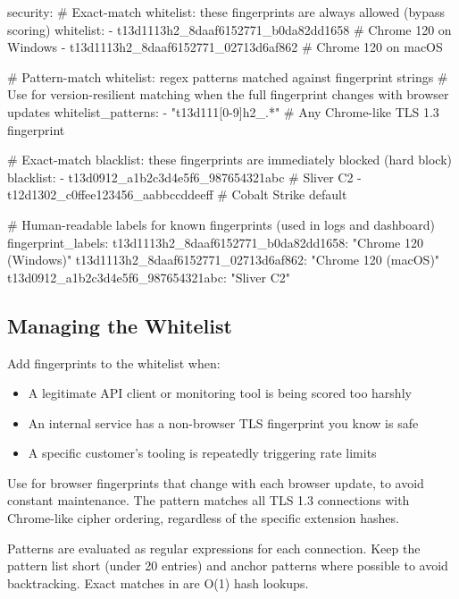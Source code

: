 \begin{yamlcode}
security:
  # Exact-match whitelist: these fingerprints are always allowed (bypass scoring)
  whitelist:
    - t13d1113h2_8daaf6152771_b0da82dd1658  # Chrome 120 on Windows
    - t13d1113h2_8daaf6152771_02713d6af862  # Chrome 120 on macOS

  # Pattern-match whitelist: regex patterns matched against fingerprint strings
  # Use for version-resilient matching when the full fingerprint changes with browser updates
  whitelist_patterns:
    - "t13d111[0-9]h2_.*"  # Any Chrome-like TLS 1.3 fingerprint

  # Exact-match blacklist: these fingerprints are immediately blocked (hard block)
  blacklist:
    - t13d0912_a1b2c3d4e5f6_987654321abc  # Sliver C2
    - t12d1302_c0ffee123456_aabbccddeeff  # Cobalt Strike default

  # Human-readable labels for known fingerprints (used in logs and dashboard)
  fingerprint_labels:
    t13d1113h2_8daaf6152771_b0da82dd1658: "Chrome 120 (Windows)"
    t13d1113h2_8daaf6152771_02713d6af862: "Chrome 120 (macOS)"
    t13d0912_a1b2c3d4e5f6_987654321abc: "Sliver C2"
\end{yamlcode}

\subsection{Managing the Whitelist}

Add fingerprints to the whitelist when:
\begin{itemize}
  \item A legitimate API client or monitoring tool is being scored too harshly
  \item An internal service has a non-browser TLS fingerprint you know is safe
  \item A specific customer's tooling is repeatedly triggering rate limits
\end{itemize}

Use  for browser fingerprints that change with each
browser update, to avoid constant maintenance. The pattern 
matches all TLS 1.3 connections with Chrome-like cipher ordering, regardless of
the specific extension hashes.

\begin{notebox}
Patterns are evaluated as regular expressions for each connection. Keep the pattern
list short (under 20 entries) and anchor patterns where possible to avoid
backtracking. Exact matches in  are O(1) hash lookups.
\end{notebox}


